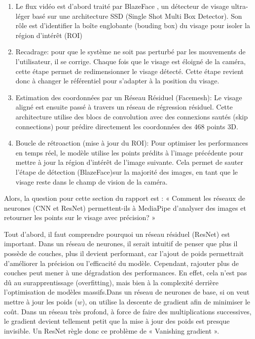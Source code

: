 \documentclass{rapportbrebeuf}
\begin{document}
\begin{enumerate}
  \item Le flux vidéo est d’abord traité par BlazeFace \cite{bazarevsky2019blazeface}, un détecteur de visage ultra-léger basé sur une architecture SSD (Single Shot Multi Box Detector). Son rôle est d'identifier la boîte englobante (bouding box) du visage pour isoler la région d'intérêt (ROI)
    \item Recadrage: pour que le système ne soit pas perturbé par les mouvements de l'utilisateur, il se corrige. Chaque fois que le visage est éloigné de la caméra, cette étape permet de redimensionner le visage détecté. Cette étape revient donc à changer le référentiel pour s'adapter à la position du visage.
    \item Estimation des coordonnées par un Réseau Résiduel (Facemesh): Le visage aligné est ensuite passé à travers un réseau de régression résiduel. Cette architecture utilise des blocs de convolution avec des connexions sautés (skip connections) pour prédire directement les coordonnées des 468 points 3D.
    \item Boucle de rétroaction (mise à jour du ROI): Pour optimiser les performances en temps réel, le modèle utilise les points prédits à l'image précédente pour mettre à jour la région d'intérêt de l'image suivante. Cela permet de sauter l'étape de détection (BlazeFace)sur la majorité des images, en tant que le visage reste dans le champ de vision de la caméra.
\end{enumerate}

Alors, la question pour cette section du rapport est : « Comment les réseaux de neurones (CNN et ResNet) permettent-ils à MediaPipe d'analyser des images et retourner les points sur le visage avec précision? »

Tout d’abord, il faut comprendre pourquoi un réseau résiduel (ResNet) est important. Dans un réseau de neurones, il serait intuitif de penser que plus il possède de couches, plus il devient performant, car l’ajout de poids permettrait d’améliorer la précision ou l’efficacité du modèle. Cependant, rajouter plus de couches peut mener à une dégradation des performances. En effet, cela n'est pas dû au surapprentissage (overfitting), mais bien à la complexité derrière l’optimisation de modèles massifs.Dans un réseau de neurones de base, si on veut mettre à jour les poids ($w$), on utilise la descente de gradient afin de minimiser le coût. Dans un réseau très profond, à force de faire des multiplications successives, le gradient devient tellement petit que la mise à jour des poids est presque invisible. Un ResNet règle donc ce problème de « Vanishing gradient ».
\end{document}
